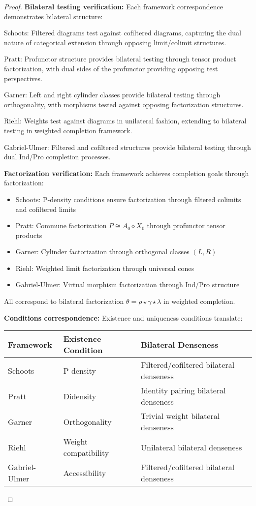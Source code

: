 \documentclass[11pt]{article}
\theoremstyle{plain}
\theoremstyle{definition}
\theoremstyle{remark}
\begin{document}
\begin{proof}
\textbf{Bilateral testing verification:} Each framework correspondence demonstrates bilateral structure:

Schoots: Filtered diagrams test against cofiltered diagrams, capturing the dual nature of categorical extension through opposing limit/colimit structures.

Pratt: Profunctor structure provides bilateral testing through tensor product factorization, with dual sides of the profunctor providing opposing test perspectives.

Garner: Left and right cylinder classes provide bilateral testing through orthogonality, with morphisms tested against opposing factorization structures.

Riehl: Weights test against diagrams in unilateral fashion, extending to bilateral testing in weighted completion framework.

Gabriel-Ulmer: Filtered and cofiltered structures provide bilateral testing through dual Ind/Pro completion processes.

\textbf{Factorization verification:} Each framework achieves completion goals through factorization:
\begin{itemize}
\item Schoots: P-density conditions ensure factorization through filtered colimits and cofiltered limits
\item Pratt: Commune factorization $P \cong A_0 \diamond X_0$ through profunctor tensor products
\item Garner: Cylinder factorization through orthogonal classes $(L, R)$
\item Riehl: Weighted limit factorization through universal cones
\item Gabriel-Ulmer: Virtual morphism factorization through Ind/Pro structure
\end{itemize}


All correspond to bilateral factorization $\theta = \rho \star \gamma \star \lambda$ in weighted completion.

\textbf{Conditions correspondence:} Existence and uniqueness conditions translate:

\begin{center}
\begin{tabular}{|l|l|l|}
\hline
\textbf{Framework} & \textbf{Existence Condition} & \textbf{Bilateral Denseness} \\
\hline
Schoots & P-density & Filtered/cofiltered bilateral denseness \\
Pratt & Didensity & Identity pairing bilateral denseness \\
Garner & Orthogonality & Trivial weight bilateral denseness \\
Riehl & Weight compatibility & Unilateral bilateral denseness \\
Gabriel-Ulmer & Accessibility & Filtered/cofiltered bilateral denseness \\
\hline
\end{tabular}
\end{center}


\end{proof}
\end{document}
